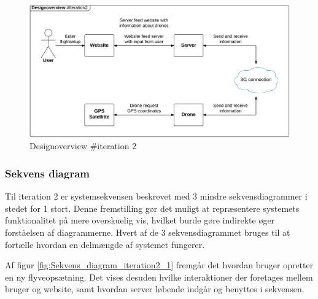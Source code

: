 \begin{figure}[H]
	\centering
	\includegraphics[width=1\textwidth]{Billeder/design_overview/design_overview_iteration2.png}
	\vspace{-.5cm}
	\caption{Designoverview \#iteration 2}
	\label{fig:design_overview_UC1}
\end{figure}



\newpage

\subsubsection*{Sekvens diagram}

Til iteration 2 er systemsekvensen beskrevet med 3 mindre sekvensdiagrammer i stedet for 1 stort. 
Denne fremstilling gør det muligt at repræsentere systemets funktionalitet på mere overskuelig vis, hvilket burde gøre indirekte øger forståelsen af diagrammerne. Hvert af de 3 sekvensdiagrammet bruges til at fortælle hvordan en delmængde af systemet fungerer.

Af figur \ref{fig:Sekvens_diagram_iteration2_1} fremgår det hvordan bruger opretter en ny flyveopsætning. Det vises desuden hvilke interaktioner der foretages mellem bruger og website, samt hvordan server løbende indgår og benyttes i sekvensen. 

